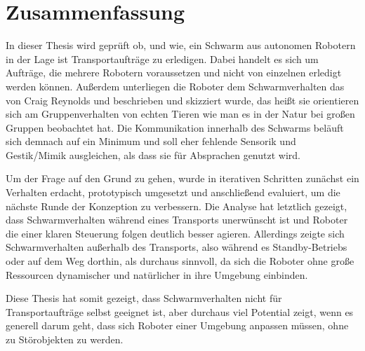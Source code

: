 \chapter*{Zusammenfassung}

In dieser Thesis wird geprüft ob, und wie, ein Schwarm aus autonomen Robotern in der Lage ist Transportaufträge zu erledigen. Dabei handelt es sich um Aufträge, die mehrere Robotern voraussetzen und nicht von einzelnen erledigt werden können. Außerdem unterliegen die Roboter dem Schwarmverhalten das von Craig Reynolds und beschrieben und skizziert wurde, das heißt sie orientieren sich am Gruppenverhalten von echten Tieren wie man es in der Natur bei großen Gruppen beobachtet hat. Die Kommunikation innerhalb des Schwarms beläuft sich demnach auf ein Minimum und soll eher fehlende Sensorik und Gestik/Mimik ausgleichen, als dass sie für Absprachen genutzt wird.

Um der Frage auf den Grund zu gehen, wurde in iterativen Schritten zunächst ein Verhalten erdacht, prototypisch umgesetzt und anschließend evaluiert, um die nächste Runde der Konzeption zu verbessern. Die Analyse hat letztlich gezeigt, dass Schwarmverhalten während eines Transports unerwünscht ist und Roboter die einer klaren Steuerung folgen deutlich besser agieren. Allerdings zeigte sich Schwarmverhalten außerhalb des Transports, also während es Standby-Betriebs oder auf dem Weg dorthin, als durchaus sinnvoll, da sich die Roboter ohne große Ressourcen dynamischer und natürlicher in ihre Umgebung einbinden.

Diese Thesis hat somit gezeigt, dass Schwarmverhalten nicht für Transportaufträge selbst geeignet ist, aber durchaus viel Potential zeigt, wenn es generell darum geht, dass sich Roboter einer Umgebung anpassen müssen, ohne zu Störobjekten zu werden.